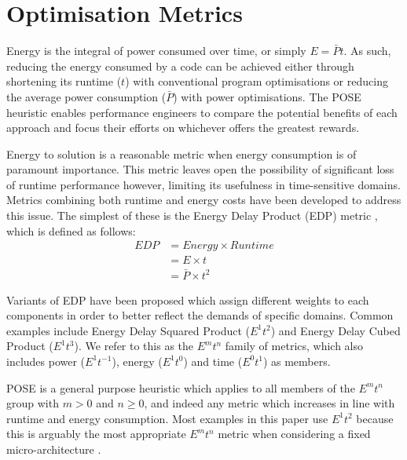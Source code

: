 \section{Optimisation Metrics}
\label{sec:metrics}
\noindent
Energy is the integral of power consumed over time, or simply $E = \bar{P}t$.
As such, reducing the energy consumed by a code can be achieved either through shortening its runtime ($t$) with conventional program optimisations or reducing the average power consumption ($\bar{P}$) with power optimisations.
The POSE heuristic enables performance engineers to compare the potential benefits of each approach and focus their efforts on whichever offers the greatest rewards.

Energy to solution is a reasonable metric when energy consumption is of paramount importance.
This metric leaves open the possibility of significant loss of runtime performance however, limiting its usefulness in time-sensitive domains.
Metrics combining both runtime and energy costs have been developed to address this issue. 
The simplest of these is the Energy Delay Product (EDP) metric \cite{gonzales:1996aa}, which is defined as follows:
\begin{align}
  EDP &= Energy \times Runtime \nonumber \\
      &= E \times t \nonumber \\
      &= \bar{P} \times t^2
  \label{eq:edp}
\end{align}

Variants of EDP have been proposed which assign different weights to each components in order to better reflect the demands of specific domains.
Common examples include Energy Delay Squared Product ($E^1t^{2}$) and Energy Delay Cubed Product ($E^1t^{3}$).
We refer to this as the $E^mt^n$ family of metrics, which also includes power ($E^1t^{-1}$), energy ($E^1t^0$) and time ($E^0t^1$) as members.

POSE is a general purpose heuristic which applies to all members of the $E^mt^n$ group with $m > 0$ and $n \geq 0$, and indeed any metric which increases in line with runtime and energy consumption.
Most examples in this paper use $E^1t^2$ because this is arguably the most appropriate $E^mt^n$ metric when considering a fixed micro-architecture \cite{brooks:2000aa}.
